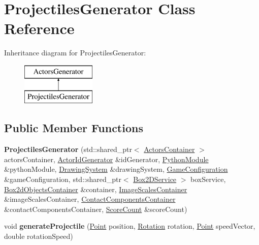 \hypertarget{classProjectilesGenerator}{}\section{Projectiles\+Generator Class Reference}
\label{classProjectilesGenerator}
Inheritance diagram for Projectiles\+Generator\+:\begin{figure}[H]
\begin{center}
\leavevmode
\includegraphics[height=2.000000cm]{classProjectilesGenerator}
\end{center}
\end{figure}
\subsection*{Public Member Functions}
\begin{DoxyCompactItemize}
\item 
{\bfseries Projectiles\+Generator} (std\+::shared\+\_\+ptr$<$ \hyperlink{classActorsContainer}{Actors\+Container} $>$ actors\+Container, \hyperlink{classActorIdGenerator}{Actor\+Id\+Generator} \&id\+Generator, \hyperlink{classPythonModule}{Python\+Module} \&python\+Module, \hyperlink{classDrawingSystem}{Drawing\+System} \&drawing\+System, \hyperlink{classGameConfiguration}{Game\+Configuration} \&game\+Configuration, std\+::shared\+\_\+ptr$<$ \hyperlink{classBox2DService}{Box2\+D\+Service} $>$ box\+Service, \hyperlink{classBox2dObjectsContainer}{Box2d\+Objects\+Container} \&container, \hyperlink{classImageScalesContainer}{Image\+Scales\+Container} \&image\+Scales\+Container, \hyperlink{classContactComponentsContainer}{Contact\+Components\+Container} \&contact\+Components\+Container, \hyperlink{classScoreCount}{Score\+Count} \&score\+Count)\hypertarget{classProjectilesGenerator_ad80730fd8adf6ead72a58b76300a1531}{}\label{classProjectilesGenerator_ad80730fd8adf6ead72a58b76300a1531}

\item 
void {\bfseries generate\+Projectile} (\hyperlink{classPoint}{Point} position, \hyperlink{classRotation}{Rotation} rotation, \hyperlink{classPoint}{Point} speed\+Vector, double rotation\+Speed)\hypertarget{classProjectilesGenerator_a4704b6ca4ef7c7e57b04e7b00866d6f5}{}\label{classProjectilesGenerator_a4704b6ca4ef7c7e57b04e7b00866d6f5}

\end{DoxyCompactItemize}
